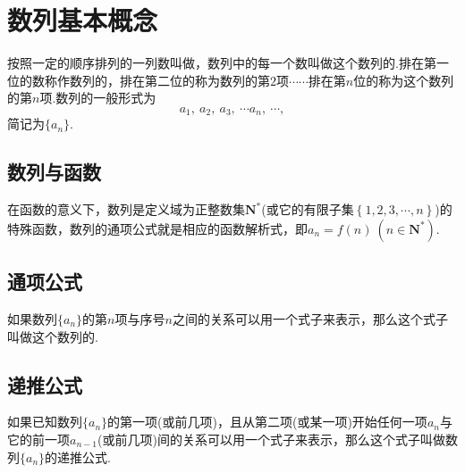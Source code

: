   \Teach{}
  \newtheorem*{Theorem}{定理}
  \makefront
\vspace{-1.5em}
\startexercise
\section{数列基本概念}
  按照一定的顺序排列的一列数叫做，数列中的每一个数叫做这个数列的.排在第一位的数称作数列的，排在第二位的称为数列的第$ 2 $项$ \cdots\cdots $排在第$ n $位的称为这个数列的第$ n $项.数列的一般形式为\[a_1,~a_2,~a_3,~\cdots a_n,~\cdots, \]简记为$ \{a_n\} $.
  \subsection{数列与函数}
    在函数的意义下，数列是定义域为正整数集$ \mathbf{N^*} $(或它的有限子集$ \left\{1,2,3,\cdots,n\right\} $)的特殊函数，数列的通项公式就是相应的函数解析式，即$ a_n=f(n)~(n\in\mathbf{N^*}) $.
  \subsection{通项公式}
    如果数列$\{a_n\}$的第$ n $项与序号$ n $之间的关系可以用一个式子来表示，那么这个式子叫做这个数列的.
  \subsection{递推公式}
    如果已知数列$\{a_n\}$的第一项(或前几项)，且从第二项(或某一项)开始任何一项$ a_n $与它的前一项$ a_{n-1} $(或前几项)间的关系可以用一个式子来表示，那么这个式子叫做数列$\{a_n\}$的递推公式.
